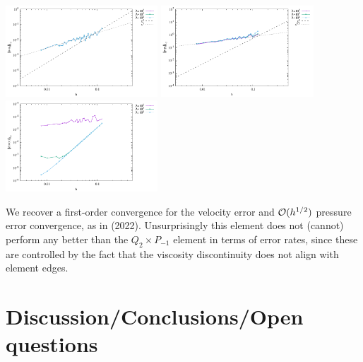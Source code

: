 \begin{center}
\includegraphics[width=5.7cm]{python_codes/fieldstone_161/results/bench4/errorsV.pdf}
\includegraphics[width=5.7cm]{python_codes/fieldstone_161/results/bench4/errorsP.pdf}
\includegraphics[width=5.7cm]{python_codes/fieldstone_161/results/bench4/errorsDivv.pdf}
\end{center}
We recover a first-order convergence for the velocity error and ${\cal O}(h^{1/2})$ 
pressure error convergence, as in \textcite{thba22} (2022).
Unsurprisingly this element does not (cannot) perform any better than
the $Q_2 \times P_{-1}$ element in terms of error rates, since these are
controlled by the fact that the viscosity discontinuity does not align with
element edges.




\newpage
\section*{Discussion/Conclusions/Open questions}

